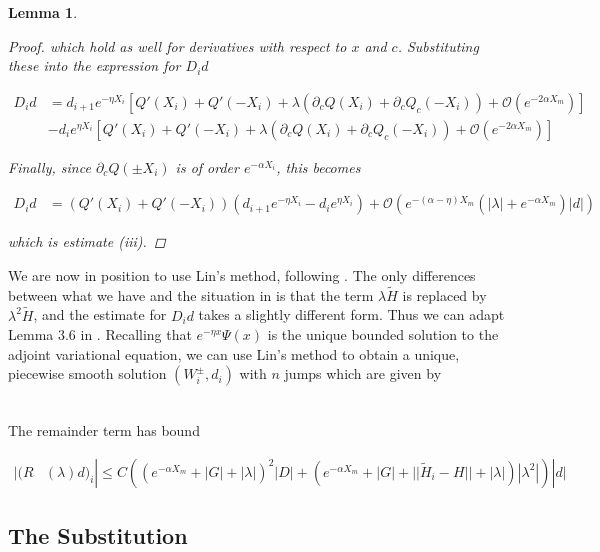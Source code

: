 \documentclass[12pt]{article}
\newtheorem{lemma}{Lemma}
\begin{document}
\begin{lemma}
\begin{proof}
which hold as well for derivatives with respect to $x$ and $c$. Substituting these into the expression for $D_i d$

\begin{align*}
D_i d &= d_{i+1} e^{-\eta X_i} \left[ Q'(X_i) + Q'(-X_i) + \lambda( \partial_c Q(X_i) + \partial_c Q_c(-X_i)) + \mathcal{O} \left( e^{-2 \alpha X_m} \right) \right] \\
&- d_i e^{\eta X_i} \left[ Q'(X_i) + Q'(-X_i) + \lambda( \partial_c Q(X_i) + \partial_c Q_c(-X_i)) + \mathcal{O} \left( e^{-2 \alpha X_m} \right) \right]
\end{align*}

Finally, since $\partial_c Q(\pm X_i)$ is of order $e^{-\alpha X_i}$, this becomes

\begin{align*}
D_i d &= ( Q'(X_i) + Q'(-X_i) )(d_{i+1} e^{-\eta X_i} - d_i e^{\eta X_i})
+ \mathcal{O} \left( e^{-(\alpha - \eta) X_m}\left( |\lambda| +  e^{-\alpha X_m} \right) |d| \right)
\end{align*}

which is estimate (iii).

\end{proof}
\end{lemma}

We are now in position to use Lin's method, following \cite{Sandstede1998}. The only differences between what we have and the situation in \cite{Sandstede1998} is that the term $\lambda \tilde{H}$ is replaced by $\lambda^2 \tilde{H}$, and the estimate for $D_i d$ takes a slightly different form. Thus we can adapt Lemma 3.6 in \cite{Sandstede1998}. Recalling that $e^{-\eta x}\Psi(x)$ is the unique bounded solution to the adjoint variational equation, we can use Lin's method to obtain a unique, piecewise smooth solution $(W_i^\pm, d_i)$ with $n$ jumps which are given by

\begin{align*}

\end{align*}

The remainder term has bound

\begin{align*}
|(R&(\lambda)d)_i| \leq C \left( (e^{-\alpha X_m} + |G| + |\lambda|)^2 |D| + (e^{-\alpha X_m} + |G| + ||\tilde{H}_i - H|| + |\lambda| )|\lambda^2| \right)|d|
\end{align*}

\subsection{The Substitution}
\end{document}

